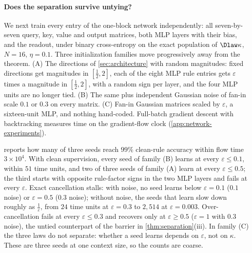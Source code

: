 \begin{table}[t]
\centering\small
\caption{\textbf{Correct computation from clean and corrupted reasoning supervision.} The clean control has no errors; both noisy regimes have local error rate $\eta=0.2$.
The same block parameters train on all $N$ selected positions. Times reach source attention $\tfrac{1}{2}$ on every prefix; the final column compares structured errors with clean supervision.}
\label{tab:causal-flow}

\end{table}

\paragraph{Does the separation survive untying?}
We next train every entry of the one-block network independently: all seven-by-seven query, key, value and output matrices,
both MLP layers with their bias, and the readout, under binary cross-entropy on the exact population of $\Dlaw\kappa$, $N=16$, $\eta=0.1$.
Three initialization families move progressively away from the theorem.
(A) The directions of \cref{sec:architecture} with random magnitudes: fixed directions get magnitudes in $[\tfrac{1}{2},2]$,
each of the eight MLP rule entries gets $\varepsilon$ times a magnitude in $[\tfrac{1}{2},2]$, with a random sign per layer, and the four MLP units are no longer tied.
(B) The same plus independent Gaussian noise of fan-in scale $0.1$ or $0.3$ on every matrix.
(C) Fan-in Gaussian matrices scaled by $\varepsilon$, a sixteen-unit MLP, and nothing hand-coded.
Full-batch gradient descent with backtracking measures time on the gradient-flow clock (\cref{app:network-experiments}).

 reports how many of three seeds reach $99\%$ clean-rule accuracy within flow time $3\times10^4$.
With clean supervision, every seed of family (B) learns at every $\varepsilon\le0.1$, within $51$ time units,
and two of three seeds of family (A) learn at every $\varepsilon\le0.5$; the third starts with opposite rule-factor signs in the two MLP layers and fails at every $\varepsilon$.
Exact cancellation stalls: with noise, no seed learns below $\varepsilon=0.1$ ($0.1$ noise) or $\varepsilon=0.5$ ($0.3$ noise);
without noise, the seeds that learn slow down roughly as $\tfrac{1}{\varepsilon}$, from $24$ time units at $\varepsilon=0.3$ to $2{,}514$ at $\varepsilon=0.003$.
Over-cancellation fails at every $\varepsilon\le0.3$ and recovers only at $\varepsilon\ge0.5$ ($\varepsilon=1$ with $0.3$ noise),
the untied counterpart of the barrier in \cref{thm:separation}(iii).
In family (C) the three laws do not separate: whether a seed learns depends on $\varepsilon$, not on $\kappa$.
These are three seeds at one context size, so the counts are coarse.

